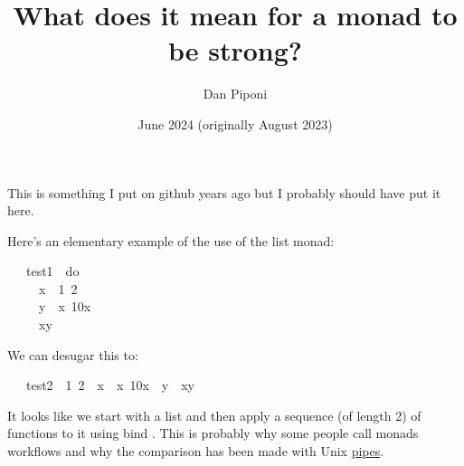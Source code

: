 \documentclass[12pt]{article}
\title{What does it mean for a monad to be strong?}
\author{Dan Piponi}
\date{June 2024 (originally August 2023)}
\begin{document}
\maketitle

This is something I put on github years ago but I probably should have put it here.

Here's an elementary example of the use of the list monad:
\begin{tabbing}\ttfamily
~~~test1~~do\\
\ttfamily ~~~~~x~~1~2\\
\ttfamily ~~~~~y~~x~10x\\
\ttfamily ~~~~~xy
\end{tabbing}
We can desugar this to:
\begin{tabbing}\ttfamily
~~~test2~~1~2~~x~~x~10x~~y~~xy
\end{tabbing}
It looks like we start with a list and then apply a sequence (of length 2) of functions to it using
bind . This is probably why some people call monads workflows and why the comparison has been
made with Unix \href{http://okmij.org/ftp/Computation/monadic-shell.html}{pipes}.
\end{document}
